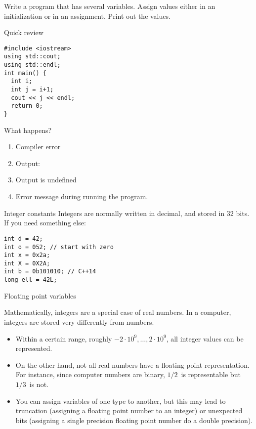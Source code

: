 \begin{exercise}
  \label{ex:print-variables}
  Write a program that has several variables. Assign values either in
  an initialization or in an assignment. Print out the values.
\end{exercise}

\begin{exercise}{Quick review}
  \label{q:initvar}
\begin{verbatim}
#include <iostream>
using std::cout;
using std::endl;
int main() {
  int i;
  int j = i+1;
  cout << j << endl;
  return 0;
}
\end{verbatim}
What happens?
\begin{enumerate}
\item Compiler error
\item Output: 
\item Output is undefined
\item Error message during running the program.
\end{enumerate}
\end{exercise}

\begin{block}{Integer constants}
  \label{sl:intvals}
  Integers are normally  written in decimal, and stored in 32 bits.
  If you need something else:
\begin{verbatim}
int d = 42;
int o = 052; // start with zero
int x = 0x2a;
int X = 0X2A;
int b = 0b101010; // C++14
long ell = 42L;
\end{verbatim}
\end{block}

 {Floating point variables}

Mathematically, integers are a special case of real numbers.
In a computer, integers are stored very differently from
 numbers.
\begin{itemize}
\item Within a certain range, roughly
  $-2\cdot 10^9,\ldots,2\cdot 10^9$,
  all integer values can be represented.
\item On the other hand, not all real numbers have a floating point
  representation. For instance, since computer numbers are binary,
  $1/2$~is representable but $1/3$~is not.
\item You can assign variables of one type to another, but this may
  lead to truncation (assigning a floating point number to an integer)
  or unexpected bits (assigning a single precision floating point
  number do a double precision).
\end{itemize}

